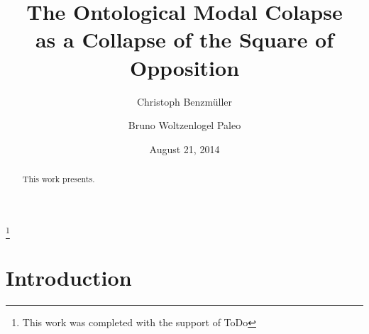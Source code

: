 \documentclass{birkjour}
\theoremstyle{definition}
\theoremstyle{remark}
\numberwithin{equation}{section}
\begin{document}
%
%
%
%
%
%
%
%
%


\title[Modal Collapse]
 {The Ontological Modal Colapse \\ 
 as a Collapse of the Square of Opposition}



\author[Benzm\"uller]{Christoph Benzm\"uller}

\address{%
Viaduktstr. 42\\
P.O. Box 133\\
CH 4010 Basel\\
Switzerland}


\thanks{This work was completed with the support of ToDo}


\author[Woltzenlogel-Paleo]{Bruno Woltzenlogel Paleo}
\address{ }


\date{August 21, 2014}
\dedicatory{ }

\begin{abstract}
This work presents.
\end{abstract}

\maketitle
\section{Introduction}
\end{document}
